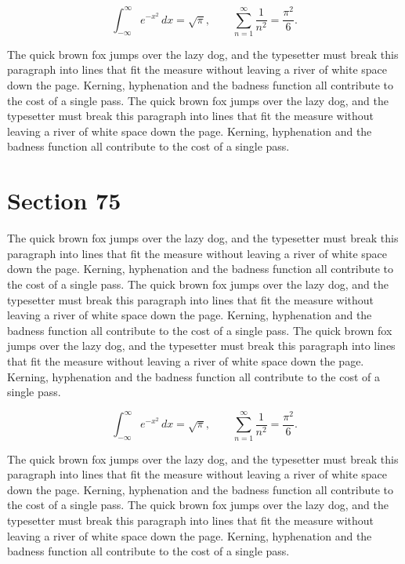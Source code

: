 \documentclass{article}
\begin{document}
\begin{equation}
\int_{-\infty}^{\infty} e^{-x^{2}}\,dx = \sqrt{\pi}, \qquad
\sum_{n=1}^{\infty} \frac{1}{n^{2}} = \frac{\pi^{2}}{6}.
\end{equation}

The quick brown fox jumps over the lazy dog, and the typesetter must break this paragraph into lines that fit the measure without leaving a river of white space down the page. Kerning, hyphenation and the badness function all contribute to the cost of a single pass. The quick brown fox jumps over the lazy dog, and the typesetter must break this paragraph into lines that fit the measure without leaving a river of white space down the page. Kerning, hyphenation and the badness function all contribute to the cost of a single pass. 
\section{Section 75}
The quick brown fox jumps over the lazy dog, and the typesetter must break this paragraph into lines that fit the measure without leaving a river of white space down the page. Kerning, hyphenation and the badness function all contribute to the cost of a single pass. The quick brown fox jumps over the lazy dog, and the typesetter must break this paragraph into lines that fit the measure without leaving a river of white space down the page. Kerning, hyphenation and the badness function all contribute to the cost of a single pass. The quick brown fox jumps over the lazy dog, and the typesetter must break this paragraph into lines that fit the measure without leaving a river of white space down the page. Kerning, hyphenation and the badness function all contribute to the cost of a single pass. 

\begin{equation}
\int_{-\infty}^{\infty} e^{-x^{2}}\,dx = \sqrt{\pi}, \qquad
\sum_{n=1}^{\infty} \frac{1}{n^{2}} = \frac{\pi^{2}}{6}.
\end{equation}

The quick brown fox jumps over the lazy dog, and the typesetter must break this paragraph into lines that fit the measure without leaving a river of white space down the page. Kerning, hyphenation and the badness function all contribute to the cost of a single pass. The quick brown fox jumps over the lazy dog, and the typesetter must break this paragraph into lines that fit the measure without leaving a river of white space down the page. Kerning, hyphenation and the badness function all contribute to the cost of a single pass. 
\end{document}
